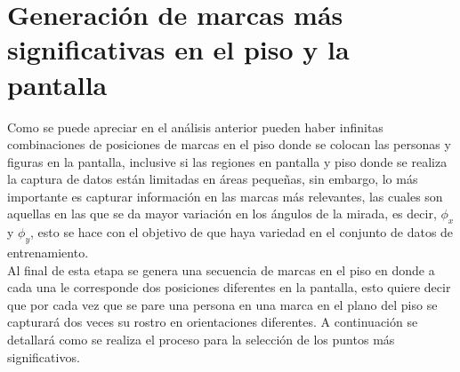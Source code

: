 	 \section{Generación de marcas más significativas en el piso y la pantalla}
	 Como se puede apreciar en el análisis anterior pueden haber infinitas combinaciones de posiciones de marcas en el piso donde se colocan las personas y figuras en la pantalla, inclusive si las regiones en pantalla y piso donde se realiza la captura de datos están limitadas en áreas pequeñas, sin embargo, lo más importante es capturar información en las marcas más relevantes, las cuales son aquellas en las que se da mayor variación en los ángulos de la mirada, es decir, $\phi_x$ y $\phi_y$, esto se hace con el objetivo de que haya variedad en el conjunto de datos de entrenamiento.	\\
	  Al final de esta etapa se genera una secuencia de marcas en el piso en donde a cada una le corresponde dos posiciones diferentes en la pantalla, esto quiere decir que por cada vez que se pare una persona en una marca en el plano del piso se capturará dos veces su rostro en orientaciones diferentes. A continuación se detallará como se realiza el proceso para la selección de los puntos más significativos.	 
